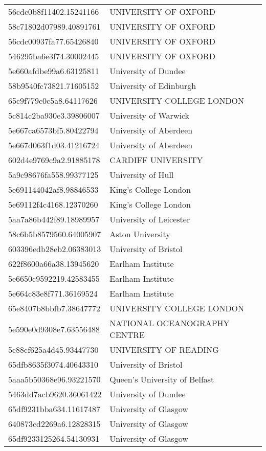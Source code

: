 \begin{tabular}{ll}
56cdc0b8f11402.15241166 & UNIVERSITY OF OXFORD \\
58c71802d07989.40891761 & UNIVERSITY OF OXFORD \\
56cdc00937fa77.65426840 & UNIVERSITY OF OXFORD \\
546295ba6e3f74.30002445 & UNIVERSITY OF OXFORD \\
5e660afdbe99a6.63125811 & University of Dundee \\
58b9540fc73821.71605152 & University of Edinburgh \\
65c9f779c0c5a8.64117626 & UNIVERSITY COLLEGE LONDON \\
5c814c2ba930e3.39806007 & University of Warwick \\
5e667ca6573bf5.80422794 & University of Aberdeen \\
5e667d063f1d03.41216724 & University of Aberdeen \\
602d4e9769c9a2.91885178 & CARDIFF UNIVERSITY \\
5a9c98676fa558.99377125 & University of Hull \\
5e691144042af8.98846533 & King's College London \\
5e69112f4c4168.12370260 & King's College London \\
5aa7a86b442f89.18989957 & University of Leicester \\
58c6b5b8579560.64005907 & Aston University \\
603396edb28eb2.06383013 & University of Bristol \\
622f8600a66a38.13945620 & Earlham Institute \\
5e6650c9592219.42583455 & Earlham Institute \\
5e664c83e8f771.36169524 & Earlham Institute \\
65e8407b8bbfb7.38647772 & UNIVERSITY COLLEGE LONDON \\
5e590e0d9308e7.63556488 & NATIONAL OCEANOGRAPHY CENTRE \\
5c88cf625a4d45.93447730 & UNIVERSITY OF READING \\
65dfb8635f3074.40643310 & University of Bristol \\
5aaa5b50368e96.93221570 & Queen's University of Belfast \\
5463dd7acb9620.36061422 & University of Dundee \\
65df9231bba634.11617487 & University of Glasgow \\
640873cd2269a6.12828315 & University of Glasgow \\
65df9233125264.54130931 & University of Glasgow \\

\end{tabular}
